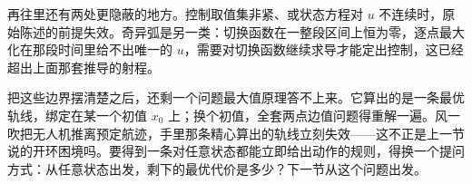 再往里还有两处更隐蔽的地方。控制取值集非紧、或状态方程对 \(u\) 不连续时，原始陈述的前提失效。奇异弧是另一类：切换函数在一整段区间上恒为零，逐点最大化在那段时间里给不出唯一的 \(u\)，需要对切换函数继续求导才能定出控制，这已经超出上面那套推导的射程。

把这些边界摆清楚之后，还剩一个问题最大值原理答不上来。它算出的是一条最优轨线，绑定在某一个初值 \(x_0\) 上；换个初值，全套两点边值问题得重解一遍。风一吹把无人机推离预定航迹，手里那条精心算出的轨线立刻失效——这不正是上一节说的开环困境吗。要得到一条对任意状态都能立即给出动作的规则，得换一个提问方式：从任意状态出发，剩下的最优代价是多少？下一节从这个问题出发。
